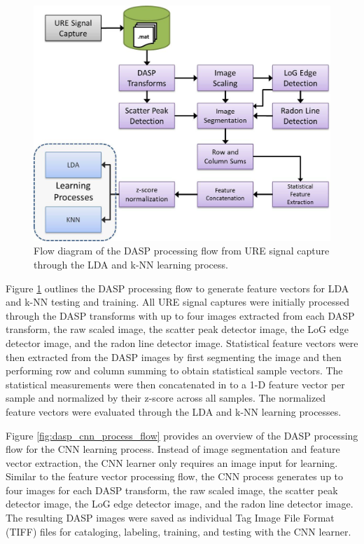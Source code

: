 \begin{figure}[tb]
	\includegraphics[width=\textwidth]{./misc_graphics/dasp_lda_knn_process_flow.jpg}
	\centering
	\caption{Flow diagram of the DASP processing flow from URE signal capture through the LDA and k-NN learning process.}
	\label{fig:dasp_lda_knn_process_flow}
\end{figure}
 
Figure \ref{fig:dasp_lda_knn_process_flow} outlines the DASP processing flow to generate feature vectors for LDA and k-NN testing and training.   All URE signal captures were initially processed through the DASP transforms with up to four images extracted from each DASP transform, the raw scaled image, the scatter peak detector image, the LoG edge detector image, and the radon line detector image.  Statistical feature vectors were then extracted from the DASP images by first segmenting the image and then performing row and column summing to obtain statistical sample vectors.  The statistical measurements were then concatenated in to a 1-D feature vector per sample and normalized by their z-score across all samples.  The normalized feature vectors were evaluated through the LDA and k-NN learning processes.

Figure \ref{fig:dasp_cnn_process_flow} provides an overview of the DASP processing flow for the CNN learning process.  Instead of image segmentation and feature vector extraction, the CNN learner only requires an image input for learning.  Similar to the feature vector processing flow, the CNN process generates up to four images for each DASP transform, the raw scaled image, the scatter peak detector image, the LoG edge detector image, and the radon line detector image.  The resulting DASP images were saved as individual Tag Image File Format (TIFF) files for cataloging, labeling, training, and testing with the CNN learner.

